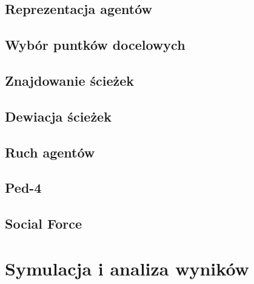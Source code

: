 \documentclass[a4paper, 12pt]{article}
\begin{document}

        \subsection{Reprezentacja agentów}
        \label{sec:actor-impl}


        \subsection{Wybór puntków docelowych}
        \label{sec:destination-choice}


        \subsection{Znajdowanie ścieżek}
        \label{sec:path-finding}


        \subsection{Dewiacja ścieżek}
        \label{sec:path-deviation}


        \subsection{Ruch agentów}
        \label{sec:movement-impl}

        \subsection{Ped-4}
        \label{sec:ped-4-impl}

        \subsection{Social Force}
        \label{sec:social-force-impl}

\newpage
    \section{Symulacja i analiza wyników}
    \label{sec:sim}
\end{document}
